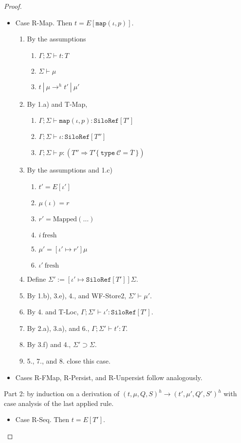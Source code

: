 \documentclass{article}
\theoremstyle{definition}
\newcommand{\seq}[1]{\overline{#1}}
\begin{document}
\begin{proof}
\begin{itemize}
\item Case R-Map. Then $t = E[\texttt{map}(\iota, p)]$.
\begin{enumerate}
\item By the assumptions
  \begin{enumerate}[label=(\alph*)]
  \item $\Gamma ; \Sigma \vdash t : T$
  \item $\Sigma \vdash \mu$
  \item $t~|~\mu \rightarrow^h t'~|~\mu'$
  \end{enumerate}
\item By 1.a) and T-Map,
  \begin{enumerate}[label=(\alph*)]
  \item $\Gamma ; \Sigma \vdash \texttt{map}(\iota, p) : \texttt{SiloRef}[T']$
  \item $\Gamma ; \Sigma \vdash \iota : \texttt{SiloRef}[T'']$
  \item $\Gamma ; \Sigma \vdash p : (T'' \Rightarrow T' \{~\texttt{type}~\mathcal{C} = \seq{T}~\})$
  \end{enumerate}
\item By the assumptions and 1.c)
  \begin{enumerate}[label=(\alph*)]
  \item $t' = E[\iota']$
  \item $\mu(\iota) = r$
  \item $r' = \text{Mapped}(\ldots)$
  \item $i~\text{fresh}$
  \item $\mu' = [\iota' \mapsto r']\mu$
  \item $\iota'~\text{fresh}$
  \end{enumerate}
\item Define $\Sigma' := [\iota' \mapsto \texttt{SiloRef}[T']]\Sigma$.
\item By 1.b), 3.e), 4., and WF-Store2, $\Sigma' \vdash \mu'$.
\item By 4. and T-Loc, $\Gamma ; \Sigma' \vdash \iota' : \texttt{SiloRef}[T']$.
\item By 2.a), 3.a), and 6., $\Gamma ; \Sigma' \vdash t' : T$.
\item By 3.f) and 4., $\Sigma' \supset \Sigma$.
\item 5., 7., and 8. close this case.
\end{enumerate}

\item Cases R-FMap, R-Persist, and R-Unpersist follow analogously.
\end{itemize}

Part 2: by induction on a derivation of $(t, \mu, Q, S)^h \longrightarrow (t', \mu', Q', S')^h$ with case analysis of the last applied rule.

\begin{itemize}
\item Case R-Seq. Then $t = E[T']$.
\end{itemize}

\end{proof}
\end{document}
